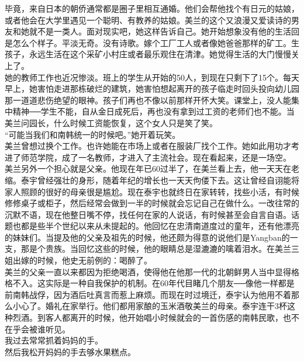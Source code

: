 毕竟，来自日本的朝侨通常都是圈子里相互通婚。他们会帮他找个有日元的姑娘，或者他会在大学里遇见一个聪明、有教养的姑娘。美兰的这个又浪漫又爱读诗的男友和她就不是一类人。面对现实吧，她这样告诉自己。她开始想象没有他的生活回是怎么个样子。平淡无奇。没有诗歌。嫁个工厂工人或者像她爸爸那样的矿工。生孩子，永远生活在这个采矿小村庄或者最乐观住在清津。她觉得生活的大门慢慢关上了。\\

她的教师工作也近况惨淡。班上的学生从开始的50人，到现在只剩下了15个。每天早上，她害怕走进那栋破烂的建筑，她害怕想起离开的孩子临走时回头投向幼儿园那一道道悲伤绝望的眼神。孩子们再也不像以前那样开怀大笑。课堂上，没人能集中精神──学生不能，自从金日成死后，再也没有拿到过工资的老师们也不能。当美兰问园长，什么时候工资能恢复，这个女人只是笑了笑。\\

“可能当我们和南韩统一的时候吧。”她开着玩笑。\\

美兰曾想过换个工作。也许她能在市场上或者在服装厂找个工作。她如此用功才考进了师范学院，成了一名教师，才进入了主流社会。现在看起来，还是一场空。\\

美兰另外一个担心就是父亲。他现在年已60过半了，在美兰看上去，他一天天在老缩。泰宇曾经强壮的身形，随着年纪的增长也一天天佝偻下去。这让曾经自诩能将家人照顾的很好的母亲很是尴尬。现在泰宇也就终日在家转转，找些小活，有时候修修桌子或柜子，然后经常会做到一半的时候就会忘记自己在做什么。一改往常的沉默不语，现在他整日嘴不停，找任何在家的人说话，有时候甚至会自言自语。话题也都是些半个世纪以来从未提起的。他回忆在忠清南道度过的童年，还有他漂亮的妹妹们。当提及他的父亲及祖先的时候，他还颇为得意的说他们是Yangban的一支，那是个贵族。当回忆这些的时候，他的眼睛总是湿漉漉的噙着泪水。在美兰三姐出嫁的时候，他史无前例的：喝醉了。\\

美兰的父亲一直以来都因为拒绝喝酒，使得他在他那一代的北朝鲜男人当中显得格格不入。这实际是一种自我保护的机制。在60年代目睹几个朋友──像他一样都是前南韩战俘，因为酒后吐真言而惹上麻烦。而现在时过境迁，泰宇认为他用不着那么小心了。婚礼在家举行。他们都用家酿的玉米酒敬美兰的母亲。泰宇连干3杯这种烈酒。到客人都离开的时候，他开始唱小时候就会的一首伤感的南韩民歌，也不在乎会被谁听见。\\

我过去常常抓着妈妈的手。\\

然后我松开妈妈的手去够水果糕点。\\


